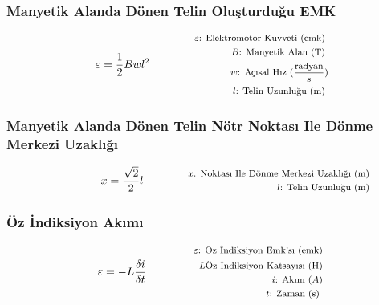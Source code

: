 \subsubsection*{Manyetik Alanda Dönen Telin Oluşturduğu EMK}
\begin{equation}
    \varepsilon = \frac{1}{2} Bwl^2 \qquad \qquad \parbox{4cm}{\footnotesize$\begin{aligned}
        \varepsilon\text{: Elektromotor Kuvveti (emk) } \\
        B\text{: Manyetik Alan (T) } \\
        w\text{: Açısal Hız } (\frac{\text{radyan}}{s}) \\
        l\text{: Telin Uzunluğu (m) }
\end{aligned}$}
\end{equation}

\subsubsection*{Manyetik Alanda Dönen Telin Nötr Noktası Ile Dönme Merkezi Uzaklığı}
\begin{equation}
    x = \frac{\sqrt{2}}{2} l \qquad \qquad \parbox{4cm}{\footnotesize$\begin{aligned}
        x\text{: Noktası Ile Dönme Merkezi Uzaklığı (m) } \\
        l\text{: Telin Uzunluğu (m) }
\end{aligned}$}
\end{equation}

\subsubsection*{Öz İndiksiyon Akımı}
\begin{equation}
    \varepsilon = -L \frac{\delta i}{ \delta t }\qquad \qquad \parbox{4cm}{\footnotesize$\begin{aligned}
        \varepsilon\text{: Öz İndiksiyon Emk'sı (emk)} \\
        -L\text{Öz İndiksiyon Katsayısı (H)} \\
        i\text{: Akım } (A)  \\
        t\text{: Zaman (s) }
\end{aligned}$}
\end{equation}
